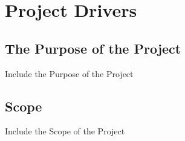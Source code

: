 \documentclass [11pt]{article}
\begin{document}
\pagebreak



\section {\textbf{Project Drivers}}

\subsection{The Purpose of the Project} 
Include the Purpose of the Project
%
%
%

\subsection{Scope}
Include the Scope of the Project
\end{document}
